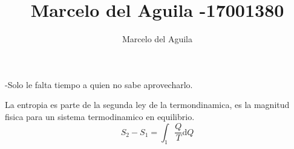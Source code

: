 \documentclass[a4paper]{article}
\title{Marcelo del Aguila -17001380}
\author{Marcelo del Aguila}
\begin{document}
	
	-Solo le falta tiempo a quien no sabe aprovecharlo.
	
	La entropia es parte de la segunda ley de la termondinamica, es la magnitud fisica para un sistema termodinamico en equilibrio.
	\begin{equation}
		S_2 - S_1 = \int_1 \frac{Q}{T} \mathrm{d}Q
	\end{equation}
	
\end{document}
